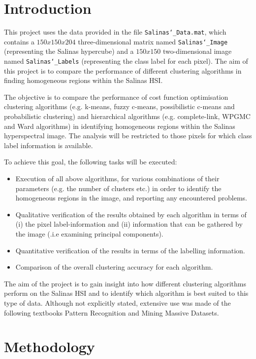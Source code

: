 \documentclass[
  course = {{DS12E Clustering Algorithms}},
  quartile = {{2}},
  assignment = ,
  name = {{Michael Darmanis ; Vasilios Venieris}},
  studentnumber = {{7115152200004 ; 7115152200017}},
  email = {{mdarm@di.uoa.gr ; vvenieris@di.uoa.gr}},
  firstexercise = 1
]{aga-homework}
\begin{document}
\section{Introduction}

This project uses the data provided in the file \texttt{Salinas\char`_Data.mat}, which contains a $150x150x204$ three-dimensional matrix named \texttt{Salinas\char`_Image} (representing the Salinas hypercube) and a $150x150$ two-dimensional image named \texttt{Salinas\char`_Labels} (representing the class label for each pixel). The aim of this project is to compare the performance of different clustering algorithms in finding homogeneous regions within the Salinas HSI.

The objective is to compare the performance of cost function optimisation clustering algorithms (e.g. k-means, fuzzy c-means, possibilistic c-means and probabilistic clustering) and hierarchical algorithms (e.g. complete-link, WPGMC and Ward algorithms) in identifying homogeneous regions within the Salinas hyperspectral image. The analysis will be restricted to those pixels for which class label information is available.

To achieve this goal, the following tasks will be executed:
\begin{itemize}
\item Execution of all above algorithms, for various combinations of their parameters (e.g. the number of clusters etc.) in order to identify the homogeneous regions in the image, and reporting any encountered problems.
\item Qualitative verification of the results obtained by each algorithm in terms of (i) the pixel label-information and (ii) information that can be gathered by the image (.i.e examining principal components).
\item Quantitative verification of the results in terms of the labelling information.
\item Comparison of the overall clustering accuracy for each algorithm.
\end{itemize}

The aim of the project is to gain insight into how different clustering algorithms perform on the Salinas HSI and to identify which algorithm is best suited to this type of data. Although not explicitly stated, extensive use was made of the following textbooks Pattern Recognition\cite{pattern} and Mining Massive Datasets\cite{leskovec}.

\section{Methodology}
\end{document}
